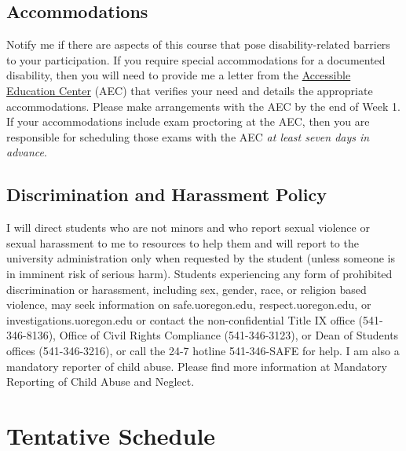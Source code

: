\documentclass[11pt]{article}
\begin{document}
\subsection*{Accommodations} 

Notify me if there are aspects of this course that pose disability-related barriers to your participation. If you require special accommodations for a documented disability, then you will need to provide me a letter from the \href{https://aec.uoregon.edu/}{Accessible Education Center} (AEC) that verifies your need and details the appropriate accommodations. Please make arrangements with the AEC by the end of Week 1. If your accommodations include exam proctoring at the AEC, then you are responsible for scheduling those exams with the AEC \textit{at least seven days in advance}.

\subsection*{Discrimination and Harassment Policy} 

I will direct students who are not minors and who report sexual violence or sexual harassment to me to resources to help them and will report to the university administration only when requested by the student (unless someone is in imminent risk of serious harm). Students experiencing any form of prohibited discrimination or harassment, including sex, gender, race, or religion based violence, may seek information on safe.uoregon.edu, respect.uoregon.edu, or investigations.uoregon.edu or contact the non-confidential Title IX office (541-346-8136), Office of Civil Rights Compliance (541-346-3123), or Dean of Students offices (541-346-3216), or call the 24-7 hotline 541-346-SAFE for help. I am also a mandatory reporter of child abuse. Please find more information at Mandatory Reporting of Child Abuse and Neglect.
\newpage
\section*{Tentative Schedule}
\end{document}
